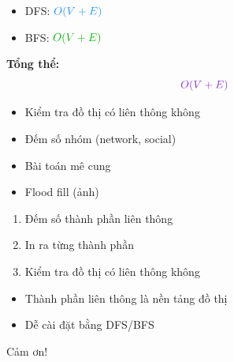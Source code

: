 \documentclass{beamer}
\newcommand{\hlblue}[1]{\textcolor{myblue}{#1}}
\newcommand{\hlgreen}[1]{\textcolor{mygreen}{#1}}
\newcommand{\hlpurple}[1]{\textcolor{mypurple}{#1}}
\newcommand{\hlorange}[1]{\textcolor{myorange}{#1}}
\begin{document}
\begin{frame}{}
\begin{itemize}
\item DFS: \(\hlblue{O(V+E)}\)
\item BFS: \(\hlgreen{O(V+E)}\)
\end{itemize}

\medskip
\textbf{Tổng thể:}
\[
\hlpurple{O(V+E)}
\]

\end{frame}

\begin{frame}{}
\begin{itemize}
\item Kiểm tra đồ thị có liên thông không
\item Đếm số nhóm (network, social)
\item Bài toán mê cung
\item Flood fill (ảnh)
\end{itemize}
\end{frame}

\begin{frame}{}
\begin{enumerate}
\item Đếm số thành phần liên thông
\item In ra từng thành phần
\item Kiểm tra đồ thị có liên thông không
\end{enumerate}
\end{frame}

\begin{frame}{}
\begin{itemize}
\item Thành phần liên thông là nền tảng đồ thị
\item Dễ cài đặt bằng DFS/BFS
\end{itemize}

\bigskip
\centerline{\hlorange{Cảm ơn!}}
\end{frame}
\end{document}
